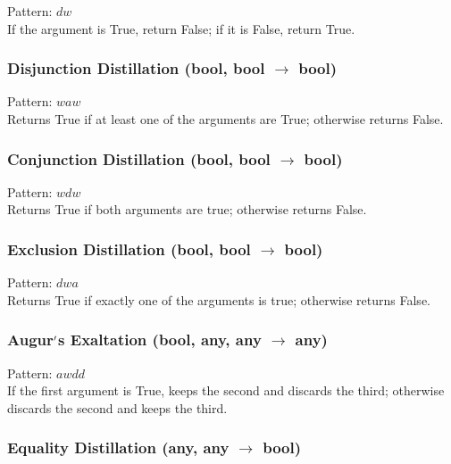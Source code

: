 \documentclass[12pt]{article}
\begin{document}
    Pattern: $dw$\\
      If the argument is True, return False; if it is False, return True.\\


  \label{sec: patterns/logic@hexcasting:or}
\subsubsection*{Disjunction Distillation (bool, bool $\rightarrow$ bool)}

    Pattern: $waw$\\
      Returns True if at least one of the arguments are True; otherwise returns False.\\


  \label{sec: patterns/logic@hexcasting:and}
\subsubsection*{Conjunction Distillation (bool, bool $\rightarrow$ bool)}

    Pattern: $wdw$\\
      Returns True if both arguments are true; otherwise returns False.\\


  \label{sec: patterns/logic@hexcasting:xor}
\subsubsection*{Exclusion Distillation (bool, bool $\rightarrow$ bool)}

    Pattern: $dwa$\\
      Returns True if exactly one of the arguments is true; otherwise returns False.\\


  \label{sec: patterns/logic@hexcasting:if}
\subsubsection*{Augur$\rq$s Exaltation (bool, any, any $\rightarrow$ any)}

    Pattern: $awdd$\\
      If the first argument is True, keeps the second and discards the third; otherwise discards the second and keeps the third.\\


  \label{sec: patterns/logic@hexcasting:equals}
\subsubsection*{Equality Distillation (any, any $\rightarrow$ bool)}
\end{document}

